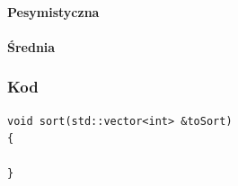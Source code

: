 \paragraph{Pesymistyczna}

\paragraph{Średnia}



\subsubsection{Kod}
\begin{lstlisting}[caption={Sortowanie przez wybieranie dla par},label={lst:wybieranie}]
void sort(std::vector<int> &toSort)
{

}
\end{lstlisting}

